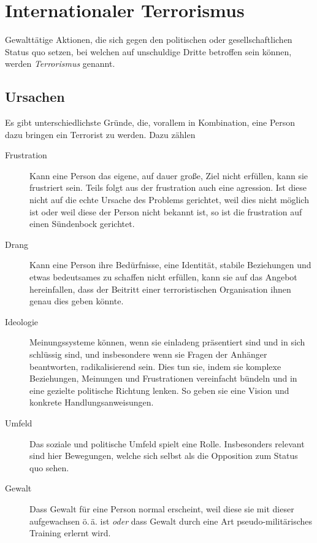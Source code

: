 \documentclass{article}
\begin{document}
\section{Internationaler Terrorismus}
Gewalttätige Aktionen, die sich gegen den politischen oder gesellschaftlichen Status quo setzen, bei welchen auf unschuldige Dritte betroffen sein können, werden \emph{Terrorismus} genannt.
 
\subsection{Ursachen}
Es gibt unterschiedlichste Gründe, die, vorallem in Kombination, eine Person dazu bringen ein Terrorist zu werden. Dazu zählen
\begin{description}
 \item[Frustration] Kann eine Person das eigene, auf dauer große, Ziel nicht erfüllen, kann sie frustriert sein. Teils folgt aus der frustration auch eine agression. Ist diese nicht auf die echte Ursache des Problems gerichtet, weil dies nicht möglich ist oder weil diese der Person nicht bekannt ist, so ist die frustration auf einen Sündenbock gerichtet.
 \item[Drang] Kann eine Person ihre Bedürfnisse, eine Identität, stabile Beziehungen und etwas bedeutsames zu schaffen nicht erfüllen, kann sie auf das Angebot hereinfallen, dass der Beitritt einer terroristischen Organisation ihnen genau dies geben könnte.
 \item[Ideologie] Meinungssysteme können, wenn sie einladeng präsentiert sind und in sich schlüssig sind, und insbesondere wenn sie Fragen der Anhänger beantworten, radikalisierend sein. Dies tun sie, indem sie komplexe Beziehungen, Meinungen und Frustrationen vereinfacht bündeln und in eine gezielte politische Richtung lenken. So geben sie eine Vision und konkrete Handlungsanweisungen.
 \item[Umfeld] Das soziale und politische Umfeld spielt eine Rolle. Insbesonders relevant sind hier Bewegungen, welche sich selbst als die Opposition zum Status quo sehen.
 \item[Gewalt] Dass Gewalt für eine Person normal erscheint, weil diese sie mit dieser aufgewachsen ö.\,ä. ist \emph{oder} dass Gewalt durch eine Art pseudo-militärisches Training erlernt wird.
\end{description} 
 
\end{document}

